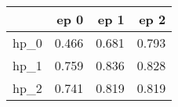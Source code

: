 \begin{tabular}{lrrr}
\toprule
{} &   ep 0 &   ep 1 &   ep 2 \\
\midrule
hp\_0 &  0.466 &  0.681 &  0.793 \\
hp\_1 &  0.759 &  0.836 &  0.828 \\
hp\_2 &  0.741 &  0.819 &  0.819 \\
\bottomrule
\end{tabular}
